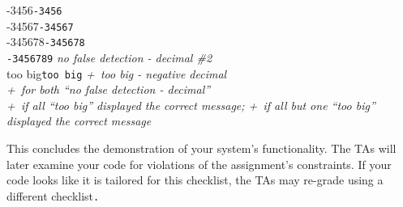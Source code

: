 \begin{enumerate}
    {\dviiseg \phantom{000}-3456}\hspace{1cm}\texttt{-3456} \\
    {\dviiseg \phantom{00}-34567}\hspace{1cm}\texttt{-34567} \\
    {\dviiseg \phantom{0}-345678}\hspace{1cm}\texttt{-345678} \\
    {}\hspace{1cm}\texttt{-3456789}\hspace{1cm}
    \textit{no false detection - decimal \#2} \\
    {\dviiseg \phantom{0}too big}\hspace{1cm}\texttt{too big}\hspace{1cm}
    \textit{+\textonequarter\ too big - negative decimal} \\
    \textit{+\textonequarter\ for both ``no false detection - decimal''} \\
    \textit{+\textonehalf\ if all ``too big'' displayed the correct message;
    +\textonequarter\ if all but one ``too big'' displayed the correct message}
\end{enumerate}

This concludes the demonstration of your system's functionality. The TAs will
later examine your code for violations of the assignment's constraints. If your
code looks like it is tailored for this checklist, the TAs may re-grade using a
different checklist\texttt{.}

